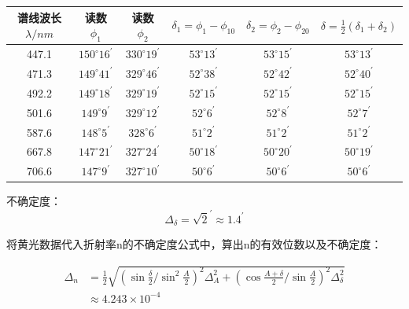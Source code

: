 \documentclass[UTF8]{ctexart}
\begin{document}
\begin{center}
    \begin{tabular}{|c|c|c|c|c|c|}
        \hline 谱线波长  $\lambda / n m$  & 读数  $\phi_{1}$  & 读数  $\phi_{2}$  & $ \delta_{1}=\phi_{1}-\phi_{10}$  &  $\delta_{2}=\phi_{2}-\phi_{20} $ &  $\delta=\frac{1}{2}\left(\delta_{1}+\delta_{2}\right) $ \\
        \hline  447.1  &  $150^{\circ} 16^{\prime}$  &  $330^{\circ} 19^{\prime}$  &  $53^{\circ} 13^{\prime}$  &  $53^{\circ} 15^{\prime}$  &  $53^{\circ} 13^{\prime}$  \\
        \hline  471.3  & $ 149^{\circ} 41^{\prime}$  & $ 329^{\circ} 46^{\prime}$  &  $52^{\circ} 38^{\prime}  $& $ 52^{\circ} 42^{\prime}$  &  $52^{\circ} 40^{\prime}$  \\
        \hline  492.2  & $ 149^{\circ} 18^{\prime} $ & $ 329^{\circ} 19^{\prime} $ & $ 52^{\circ} 15^{\prime} $ &  $52^{\circ} 15^{\prime} $ &  $52^{\circ} 15^{\prime}$  \\
        \hline  501.6  & $ 149^{\circ} 9^{\prime} $ &  $329^{\circ}  12^{\prime}$  &  $52^{\circ} 6^{\prime}$  &  $52^{\circ} 8^{\prime}$  &  $52^{\circ} 7^{\prime} $ \\
        \hline  587.6  &  $148^{\circ} 5^{\prime}$  &  $328^{\circ}  6^{\prime}$  &  $51^{\circ} 2^{\prime}$  &  $51^{\circ} 2^{\prime}$  &  $51^{\circ} 2^{\prime} $ \\
        \hline  667.8  & $ 147^{\circ} 21^{\prime} $ &  $327^{\circ} 24^{\prime}  $& $ 50^{\circ} 18^{\prime}$  &  $50^{\circ} 20^{\prime} $ &  $50^{\circ} 19^{\prime} $ \\
        \hline  706.6  &  $147^{\circ} 9^{\prime}$  &  $327^{\circ}  10^{\prime} $ &  $50^{\circ} 6^{\prime}$  &  $50^{\circ} 6^{\prime}$  &  $50^{\circ} 6^{\prime}$  \\
        \hline
        \end{tabular}
\end{center}

不确定度：
$$
\Delta_{\delta}=\sqrt{2}^{\prime} \approx 1.4^{\prime}
$$

将黄光数据代入折射率n的不确定度公式中，算出n的有效位数以及不确定度：

\begin{align}
    \Delta_{n}&=\frac{1}{2} \sqrt{\left(\sin \frac{\delta}{2} / \sin ^{2} \frac{A}{2}\right)^{2} \Delta_{A}^{2}+\left(\cos \frac{A+\delta}{2} / \sin \frac{A}{2}\right)^{2} \Delta_{\delta}^{2}} \nonumber\\
    &\approx 4.243 \times 10^{-4} \nonumber
\end{align}
\end{document}
